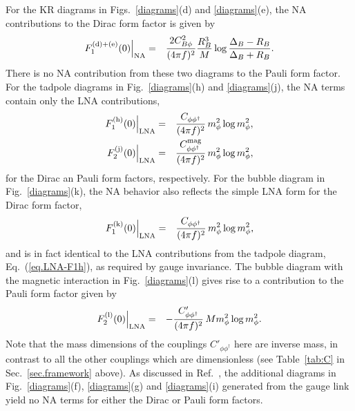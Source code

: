 \documentclass[preprintnumbers,prd,superscriptaddress,preprint]{revtex4-1}
\begin{document}
For the KR diagrams in Figs.~\ref{diagrams}(d) and \ref{diagrams}(e), the NA contributions to the Dirac form factor is given by
%
\begin{eqnarray}
F_1^{\rm (d)+(e)}(0)\Big|_{\rm NA}
&=& \frac{2 C^2_{B\phi}}{(4\pi f)^2} 
\frac{R_B^3}{M} \log\frac{\Delta_B-R_B}{\Delta_B+R_B}.
\end{eqnarray}
%
There is no NA contribution from these two diagrams to the Pauli form factor.
%
For the tadpole diagrams in Fig.~\ref{diagrams}(h) and \ref{diagrams}(j), the NA terms contain only the LNA contributions,
%
\begin{eqnarray}
\label{eq.LNA-F1h}
F_1^{\rm (h)}(0)\Big|_{\rm LNA}
&=& \frac{C_{\phi\phi^\dagger}}{(4\pi f)^2}\, m_\phi^2 \log m_\phi^2,
\\
F_2^{\rm (j)}(0)\Big|_{\rm LNA}
&=&\frac{C^{\rm mag}_{\phi\phi^\dagger}}{(4\pi f)^2}\, m_\phi^2\log m_\phi^2,
\end{eqnarray}
%
for the Dirac an Pauli form factors, respectively.
%
For the bubble diagram in Fig.~\ref{diagrams}(k), the NA behavior also reflects the simple LNA form for the Dirac form factor,
%
\begin{eqnarray}
\label{eq.LNA-F1k}
F_1^{\rm (k)}(0)\Big|_{\rm LNA}
&=& \frac{C_{\phi\phi^\dagger}}{(4\pi f)^2}\, m_\phi^2 \log m_\phi^2,
\end{eqnarray}
%
and is in fact identical to the LNA contributions from the tadpole diagram, Eq.~(\ref{eq.LNA-F1h}), as required by gauge invariance.
%
The bubble diagram with the magnetic interaction in Fig.~\ref{diagrams}(l) gives rise to a contribution to the Pauli form factor given by
%
\begin{eqnarray}
\label{eq.LNA-F2h}
F_2^{\rm (l)}(0)\Big|_{\rm LNA}
&=& -\frac{C'_{\phi\phi^\dagger}}{(4\pi f)^2}\, M m_\phi^2\log m_\phi^2.
\end{eqnarray}
%
Note that the mass dimensions of the couplings $C'_{\phi\phi^\dagger}$ here are inverse mass, in contrast to all the other couplings which are dimensionless (see Table~\ref{tab:C} in Sec.~\ref{sec.framework} above).
%
As discussed in Ref.~\cite{Salamu:2018cny}, the additional diagrams in Fig.~\ref{diagrams}(f), \ref{diagrams}(g) and \ref{diagrams}(i) generated from the gauge link yield no NA terms for either the Dirac or Pauli form factors.
\end{document}

